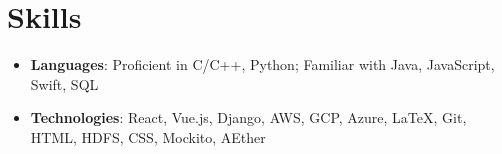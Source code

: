 \documentclass[letterpaper,11pt]{article}
\newcommand{\resumeItem}[2]{
  \item[]\small{
    \textbf{#1}{: #2 \vspace{-2pt}}
  }
}
\newcommand{\resumeSubItem}[2]{\resumeItem{\small#1}{\small#2}\vspace{-4pt}}
\newcommand{\resumeSubHeadingListStart}{\begin{itemize}[leftmargin=*]}
\newcommand{\resumeSubHeadingListEnd}{\end{itemize}}
\begin{document}
\section{Skills}
  \resumeSubHeadingListStart
    \resumeSubItem{Languages}
      {Proficient in C/C++, Python; Familiar with Java, JavaScript, Swift, SQL}
    \resumeSubItem{Technologies}
      {React, Vue.js, Django, AWS, GCP, Azure, \LaTeX, Git, HTML, HDFS, CSS, Mockito, AEther}
  \resumeSubHeadingListEnd


\end{document}
